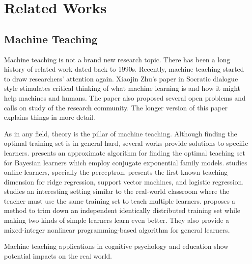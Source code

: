 
\chapter{Related Works}
\label{chap:related}

\section{Machine Teaching}

    Machine teaching is not a brand new research topic.
    There has been a long history of related work dated back to 1990s.
    Recently, machine teaching started to draw researchers' attention again.
    Xiaojin Zhu's paper in Socratic dialogue style \cite{Zhu2015} stimulates critical thinking of
    what machine learning is and how it might help machines and humans.
    The paper also proposed several open problems and calls on study of the research community.
    The longer version \cite{Zhu2018} of this paper explains things in more detail.

    As in any field, theory is the pillar of machine teaching.
    Although finding the optimal training set is in general hard,
    several works provide solutions to specific learners.
    \textcite{zhu2013machine} presents an approximate algorithm for finding the optimal teaching set
    for Bayesian learners which employ conjugate exponential family models.
    \textcite{xuezhou_zhang_optimal_2016} studies online learners, specially the perceptron.
    \textcite{liu2016teaching} presents the first known teaching dimension for ridge regression,
    support vector machines, and logistic regression.
    \textcite{zhu2017no} studies an interesting setting similar to the real-world classroom
    where the teacher must use the same training set to teach multiple learners.
    \textcite{ma2018teacher} proposes a method to trim down an independent identically distributed training set
    while making two kinds of simple learners learn even better.
    They also provide a mixed-integer nonlinear programming-based algorithm for general learners.

    Machine teaching applications in cognitive psychology and education show potential impacts on the real world.
    \textcite{khan2011humans} 
















